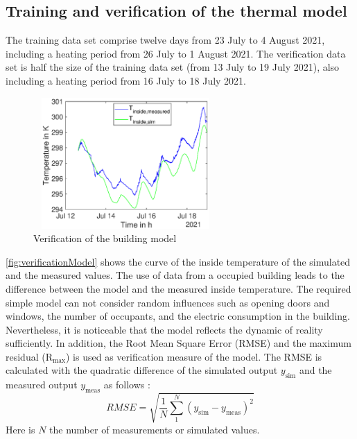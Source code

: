    \subsection{Training and verification of the thermal model}
    \label{verificationthermalmodel}
    The training data set comprise twelve days from 23 July to 4 August 2021, including a heating period from 26 July to 1 August 2021. The verification data set is half the size of the training data set (from 13 July to 19 July 2021), also including a heating period from 16 July to 18 July 2021. \newline
    \begin{figure}[h]
            \centering
            \includegraphics[width=7cm,height=5cm]{figure/Verlauf_inside_ValidierungModell.eps}
           \caption{Verification of the building model}
           \label{fig:verificationModel}
    \end{figure}
   \autoref{fig:verificationModel} shows the curve of the inside temperature of the simulated and the measured values. The use of data from a occupied building leads to the difference between the model and the measured inside temperature. The required simple model can not consider random influences such as opening doors and windows, the number of occupants, and the electric consumption in the building. Nevertheless, it is noticeable that the model reflects the dynamic of reality sufficiently. In addition, the Root Mean Square Error (RMSE)  and the maximum residual ($\mathrm{R}_\text{max}$) is used as verification measure of the model.\newline
    The RMSE is calculated with the quadratic difference of the simulated output $y_\text{sim}$ and the measured output $y_\text {meas}$ as follows \cite{Barnston.1992}: 
    \begin{equation}
        RMSE = \sqrt{\frac{1}{N} \sum \limits_1^N (y_\text{sim} - y_\text {meas})^2}
    \end{equation}
    Here is $N$ the number of measurements or simulated values.
